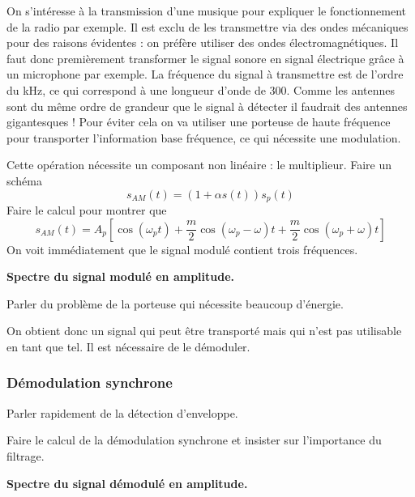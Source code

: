 On s'intéresse à la transmission d'une musique pour expliquer le fonctionnement de la radio par exemple.
Il est exclu de les transmettre via des ondes mécaniques pour des raisons évidentes : on préfère utiliser des ondes électromagnétiques.
Il faut donc premièrement transformer le signal sonore en signal électrique grâce à un microphone par exemple.
La fréquence du signal à transmettre est de l'ordre du kHz, ce qui correspond à une longueur d'onde de \unit{300}{\kilo\meter}.
Comme les antennes sont du même ordre de grandeur que le signal à détecter il faudrait des antennes gigantesques !
Pour éviter cela on va utiliser une porteuse de haute fréquence pour transporter l'information base fréquence, ce qui nécessite une modulation.

Cette opération nécessite un composant non linéaire : le multiplieur.
Faire un schéma
\begin{equation}
s_{AM}(t) = (1+\alpha s(t))s_p(t)
\end{equation}
Faire le calcul pour montrer que 
\begin{equation}
s_{AM}(t) = A_p \left[ \cos(\omega_p t) + \frac{m}{2}\cos(\omega_p-\omega)t + \frac{m}{2}\cos(\omega_p+\omega)t \right] 
\end{equation}
On voit immédiatement que le signal modulé contient trois fréquences.

\begin{slide}
\textbf{Spectre du signal modulé en amplitude.}
\end{slide}

Parler du problème de la porteuse qui nécessite beaucoup d'énergie.

\begin{transition}
On obtient donc un signal qui peut être transporté mais qui n'est pas utilisable en tant que tel.
Il est nécessaire de le démoduler.
\end{transition}

\subsubsection{Démodulation synchrone}

Parler rapidement de la détection d'enveloppe.

Faire le calcul de la démodulation synchrone et insister sur l'importance du filtrage.
 
\begin{slide}
\textbf{Spectre du signal démodulé en amplitude.}
\end{slide}

